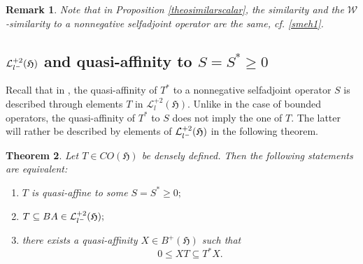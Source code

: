 \documentclass{amsart}
\newtheorem{theorem}{Theorem}[section]
\newtheorem{remark}[theorem]{Remark}
\newcommand{\h}{\mathfrak{H}}
\newcommand{\adj}{^*}
\newcommand{\tstar}{T^{*}}
\newcommand{\inclu}{\subseteq}
\newcommand{\lplus}{B^{+}(\h)}
\newcommand{\ldeux}{\mathcal{L}_l^{+2}(\h)}
\newcommand{\lldeux}{\mathcal{L}_{{l}^{\tiny-}}^{+2}(\h)}
\numberwithin{equation}{section}
\renewcommand{\labelenumi}{(\arabic{enumi})}
\begin{document}
\begin{remark} \normalfont  Note that in Proposition \ref{theosimilarscalar}, the similarity and the $\mathcal{W}$-similarity to a nonnegative  selfadjoint operator are the same, cf. \eqref{smeh1}.
\end{remark}


\subsection{$\lldeux$ and quasi-affinity to $S=S\adj \geq 0$}\label{subsectionlldeux}

Recall that in , the quasi-affinity of $\tstar$ to a nonnegative selfadjoint operator $S$   is described  through elements $T$ in $\ldeux$. Unlike in the case of bounded operators, the quasi-affinity of $\tstar$ to $S$ does not  imply the one of $T$. The latter will rather  be described by elements of $\lldeux$ in the  following theorem.

\begin{theorem}\label{TBAsurjective}
   Let $T\in CO(\h) $ be densely defined. Then the following statements are equivalent:
   \begin{enumerate}\def\labelenumi{\rm(\roman{enumi})}
       \item   $T$ is  quasi-affine to some $S=S\adj \geq 0;$
       \item $T \inclu B A  \in \lldeux ;$
        \item there exists a quasi-affinity $X \in \lplus$  such that
         $$
      0 \leq X T  \inclu  \tstar X.
        $$
   \end{enumerate}
\end{theorem}
\end{document}
